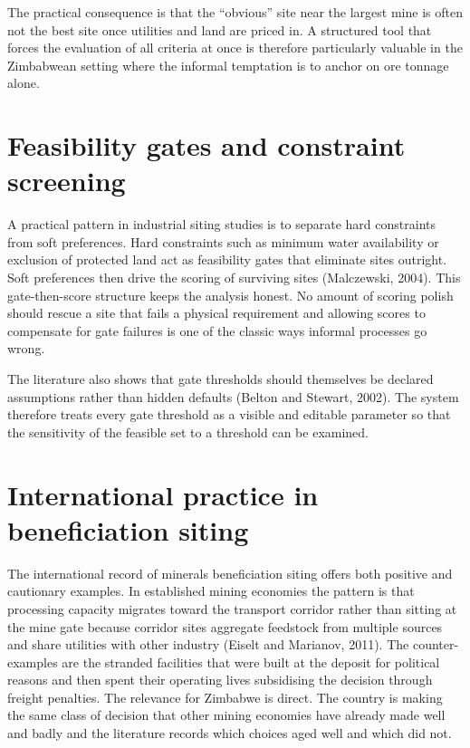 \documentclass[12pt,a4paper]{report}
\begin{document}
The practical consequence is that the ``obvious'' site near the largest
mine is often not the best site once utilities and land are priced in.
A structured tool that forces the evaluation of all criteria at once
is therefore particularly valuable in the Zimbabwean setting where the
informal temptation is to anchor on ore tonnage alone.

\section{Feasibility gates and constraint screening}
A practical pattern in industrial siting studies is to separate hard
constraints from soft preferences. Hard constraints such as minimum
water availability or exclusion of protected land act as feasibility
gates that eliminate sites outright. Soft preferences then drive the
scoring of surviving sites (Malczewski, 2004). This gate-then-score
structure keeps the analysis honest. No amount of scoring polish
should rescue a site that fails a physical requirement and allowing
scores to compensate for gate failures is one of the classic ways
informal processes go wrong.

The literature also shows that gate thresholds should themselves be
declared assumptions rather than hidden defaults (Belton and Stewart,
2002). The system therefore treats every gate threshold as a visible
and editable parameter so that the sensitivity of the feasible set to
a threshold can be examined.

\section{International practice in beneficiation siting}
The international record of minerals beneficiation siting offers both
positive and cautionary examples. In established mining economies the
pattern is that processing capacity migrates toward the transport
corridor rather than sitting at the mine gate because corridor sites
aggregate feedstock from multiple sources and share utilities with
other industry (Eiselt and Marianov, 2011). The counter-examples are
the stranded facilities that were built at the deposit for political
reasons and then spent their operating lives subsidising the decision
through freight penalties. The relevance for Zimbabwe is direct. The
country is making the same class of decision that other mining
economies have already made well and badly and the literature records
which choices aged well and which did not.
\end{document}
